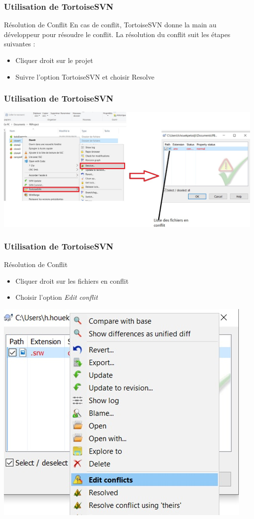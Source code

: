 \documentclass{beamer}
\begin{document}
\begin{frame}
\frametitle{Utilisation de TortoiseSVN}
\begin{block}{Résolution de Conflit}
En cas de conflit, TortoiseSVN donne la main au développeur pour résoudre le conflit. La résolution du conflit suit les étapes suivantes :
\begin{itemize}
\item Cliquer droit sur le projet
\item Suivre l'option TortoiseSVN et choisir \alert{Resolve}
\end{itemize}
\end{block}
\end{frame}
\begin{frame}
\frametitle{Utilisation de TortoiseSVN}
\includegraphics[scale=0.5]{../images/conflit3.jpg}
\end{frame}
\begin{frame}
\frametitle{Utilisation de TortoiseSVN}
\begin{block}{Résolution de Conflit}
\begin{itemize}
\item Cliquer droit sur les fichiers en conflit
\item Choisir l'option \alert{\textit{Edit conflit}}
\end{itemize}
\end{block}
\includegraphics[scale=0.5]{../images/conflit4.jpg}
\end{frame}
\end{document}
